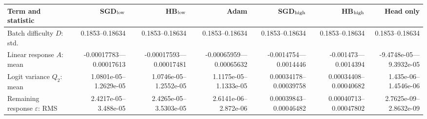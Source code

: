 \begin{tabular}{lrrrrrr}
\hline
Term and statistic & SGD$_{\rm low}$ & HB$_{\rm low}$ & Adam & SGD$_{\rm high}$ & HB$_{\rm high}$ & Head only \\
\hline
Batch difficulty $D$: std. & 0.1853--0.18634 & 0.1853--0.18634 & 0.1853--0.18634 & 0.1853--0.18634 & 0.1853--0.18634 & 0.1853--0.18634 \\
Linear response $A$: mean & -0.00017783---0.00017613 & -0.00017593---0.00017481 & -0.00065959---0.00065632 & -0.0014754---0.0014446 & -0.001473---0.0014394 & -9.4748e-05---9.3932e-05 \\
Logit variance $Q_2$: mean & 1.0801e-05--1.2629e-05 & 1.0746e-05--1.2552e-05 & 1.1175e-05--1.1333e-05 & 0.00034178--0.00039758 & 0.00034408--0.00040682 & 1.435e-06--1.4546e-06 \\
Remaining response $\varepsilon$: RMS & 2.4217e-05--3.488e-05 & 2.4265e-05--3.5303e-05 & 2.6141e-06--2.872e-06 & 0.00039843--0.00046482 & 0.00040713--0.00047802 & 2.7625e-09--2.8632e-09 \\
\hline
\end{tabular}

